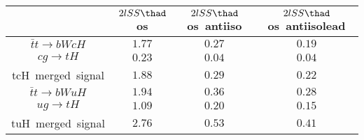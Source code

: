 \centering
\begin{tabular}{|c|c|c|c|} \hline
 & $2lSS\thad$ os & $2lSS\thad$ os~antiiso & $2lSS\thad$ os~antiisolead\\\hline
$\bar{t}t\to bWcH$ & $1.77$ & $0.27$ & $0.19$\\\hline
$cg\to tH$ & $0.23$ & $0.04$ & $0.04$\\\hline
tcH~merged~signal & $1.88$ & $0.29$ & $0.22$\\\hline
$\bar{t}t\to bWuH$ & $1.94$ & $0.36$ & $0.28$\\\hline
$ug\to tH$ & $1.09$ & $0.20$ & $0.15$\\\hline
tuH~merged~signal & $2.76$ & $0.53$ & $0.41$\\\hline
\end{tabular}
